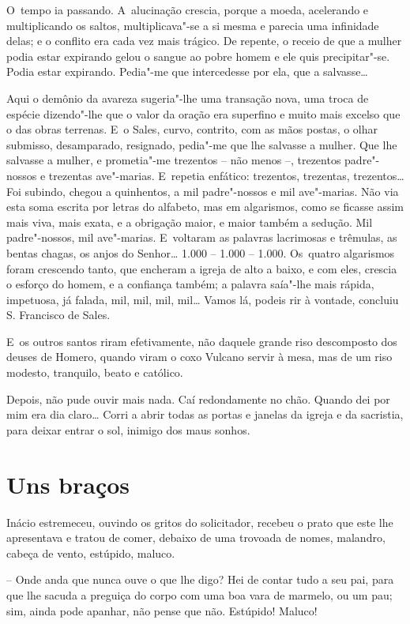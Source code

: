 O~tempo ia passando. A~alucinação crescia, porque a moeda, acelerando e
multiplicando os saltos, multiplicava"-se a si mesma e parecia uma
infinidade delas; e o conflito era cada vez mais trágico. De repente, o
receio de que a mulher podia estar expirando gelou o sangue ao pobre
homem e ele quis precipitar"-se. Podia estar expirando. Pedia"-me que
intercedesse por ela, que a salvasse\ldots{}

Aqui o demônio da avareza sugeria"-lhe uma transação nova, uma troca de
espécie dizendo"-lhe que o valor da oração era superfino e muito mais
excelso que o das obras terrenas. E~o Sales, curvo, contrito, com as
mãos postas, o olhar submisso, desamparado, resignado, pedia"-me que lhe
salvasse a mulher. Que lhe salvasse a mulher, e prometia"-me trezentos --
não menos --, trezentos padre"-nossos e trezentas ave"-marias. E~repetia
enfático: trezentos, trezentas, trezentos\ldots{} Foi subindo, chegou a
quinhentos, a mil padre"-nossos e mil ave"-marias. Não via esta soma
escrita por letras do alfabeto, mas em algarismos, como se ficasse assim
mais viva, mais exata, e a obrigação maior, e maior também a sedução.
Mil padre"-nossos, mil ave"-marias. E~voltaram as palavras lacrimosas e
trêmulas, as bentas chagas, os anjos do Senhor\ldots{} 1.000 -- 1.000 --
1.000. Os~quatro algarismos foram crescendo tanto, que encheram a igreja
de alto a baixo, e com eles, crescia o esforço do homem, e a confiança
também; a palavra saía"-lhe mais rápida, impetuosa, já falada, mil, mil,
mil, mil\ldots{} Vamos lá, podeis rir à vontade, concluiu S. Francisco de
Sales.

E~os outros santos riram efetivamente, não daquele grande riso
descomposto dos deuses de Homero, quando viram o coxo Vulcano servir à
mesa, mas de um riso modesto, tranquilo, beato e católico.

Depois, não pude ouvir mais nada. Caí redondamente no chão. Quando dei
por mim era dia claro\ldots{} Corri a abrir todas as portas e janelas da
igreja e da sacristia, para deixar entrar o sol, inimigo dos maus
sonhos.

\chapter{Uns braços}

Inácio estremeceu, ouvindo os gritos do solicitador, recebeu o prato que
este lhe apresentava e tratou de comer, debaixo de uma trovoada de
nomes, malandro, cabeça de vento, estúpido, maluco.

-- Onde anda que nunca ouve o que lhe digo? Hei de contar tudo a seu
pai, para que lhe sacuda a preguiça do corpo com uma boa vara de
marmelo, ou um pau; sim, ainda pode apanhar, não pense que não.
Estúpido! Maluco!

